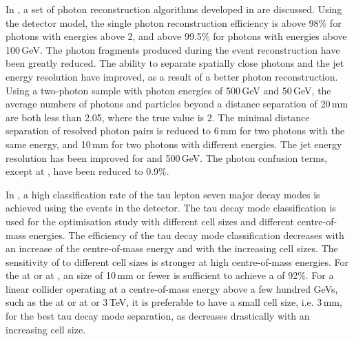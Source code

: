  In , a set of photon reconstruction algorithms developed in \pandora are discussed. Using the \ILD detector model, the single photon reconstruction efficiency is above 98\% for photons with energies above 2\GeV, and above 99.5\% for photons with energies above 100\,GeV. The photon fragments produced during the event reconstruction have been greatly reduced. The ability to separate spatially close photons and the jet energy resolution have improved, as a result of a better photon reconstruction. Using a two-photon sample with photon energies of  500\,GeV and 50\,GeV, the average numbers of photons and particles beyond a distance separation of 20\,mm  are both less than 2.05, where the true value is 2. The minimal distance separation of  resolved photon pairs is reduced to 6\,mm for two photons with the same energy, and 10\,mm for two photons with different energies. The jet energy resolution has been improved for  and 500\,GeV. The photon confusion terms, except at , have been reduced to 0.9\%.



In , a high classification rate of the tau lepton seven major decay modes is achieved using the \eeTauTau events in the \ILD detector. The tau decay mode classification is used for the \ECAL optimisation study with different \ECAL cell sizes and different centre-of-mass energies. The efficiency of the tau decay mode classification  decreases with an increase of the centre-of-mass energy and with the  increasing \ECAL cell sizes. The sensitivity of \tauHad to different cell sizes is stronger at high centre-of-mass energies.  For the \ILC at  or \CLIC at , an \ECAL size of 10\,mm or fewer is sufficient to achieve a \tauHad of 92\%. For a linear collider operating at a centre-of-mass energy above a few hundred GeVs, such as the \ILC at  or \CLIC at  or 3\,TeV, it is preferable to have a small \ECAL cell size, i.e. 3\,mm,  for the best tau decay mode separation, as \tauHad decreases drastically with an increasing \ECAL cell size.

